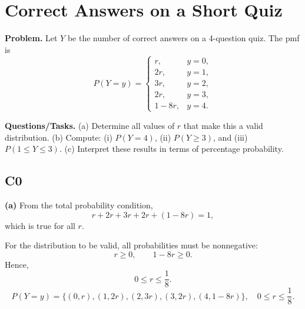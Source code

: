 		
		\section{Correct Answers on a Short Quiz}
		
		\textbf{Problem.}
		Let $Y$ be the number of correct answers on a 4-question quiz. The pmf is
		\[
		P(Y=y)=\begin{cases}
			r, & y=0,\\
			2r, & y=1,\\
			3r, & y=2,\\
			2r, & y=3,\\
			1-8r, & y=4.
		\end{cases}
		\]
		
		\textbf{Questions/Tasks.}
		(a) Determine all values of $r$ that make this a valid distribution.
		(b) Compute: (i) $P(Y=4)$, (ii) $P(Y\ge 3)$, and (iii) $P(1\le Y\le 3)$.
		(c) Interpret these results in terms of percentage probability.
		
		\subsection*{C0}

		\textbf{(a)} From the total probability condition,
		\[
		r+2r+3r+2r+(1-8r)=1,
		\]
		which is true for all $r$.
		
		For the distribution to be valid, all probabilities must be nonnegative:
		\[
		r\ge 0,\qquad 1-8r\ge 0.
		\]
		Hence,
		\[
		0\le r\le \frac{1}{8}.
		\]
		\[
		P(Y=y)=\{(0,r),(1,2r),(2,3r),(3,2r),(4,1-8r)\},\quad 0\le r\le\frac18.
		\]
		\begin{center}
		\hspace{0.35cm}
		\end{center}
		

